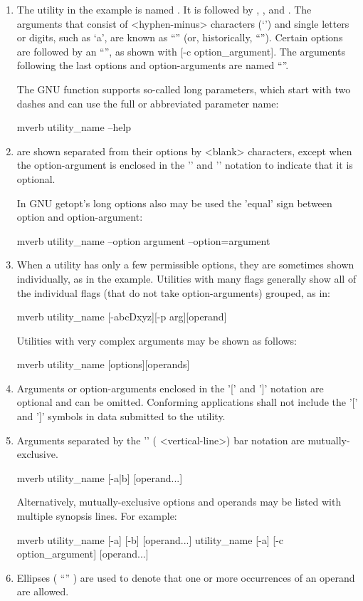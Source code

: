 \noindent
\begin{enumerate}
\item The utility in the example is named .
It is followed by , , and .
The arguments that consist of <hyphen-minus> characters (`\struct{-}') and
single letters or digits, such as `a', are known as ``''
(or, historically, ``''). Certain options are followed by
an ``'', as shown with [-c option\_argument].
The arguments following the last options and option-arguments are
named ``''.

The GNU  function supports so-called long parameters, which start
with two dashes and can use the full or abbreviated parameter name:
\begin{code}{mverb}
utility_name --help
\end{code}
\item {} are shown separated from their options by
<blank> characters, except when the option-argument is enclosed in the
'\struct{[}' and '\struct{]}' notation to indicate that it is optional.

In GNU getopt's long options also may be used the 'equal' sign between
option and option-argument:
\begin{code}{mverb}
utility_name --option argument --option=argument
\end{code}
\item When a utility has only a few permissible options, they are
sometimes shown individually, as in the example. Utilities with many
flags generally show all of the individual flags (that do not take
option-arguments) grouped, as in:
\begin{code}{mverb}
utility_name [-abcDxyz][-p arg][operand]
\end{code}
Utilities with very complex arguments may be shown as follows:
\begin{code}{mverb}
utility_name [options][operands]
\end{code}
\item Arguments or option-arguments enclosed in the '[' and ']'
notation are optional and can be omitted. Conforming applications shall
not include the '[' and ']' symbols in data submitted to the utility.
\item Arguments separated by the '\struct{|}' ( <vertical-line>) bar notation
are mutually-exclusive.
\begin{code}{mverb}
utility_name [-a|b] [operand...]
\end{code}
Alternatively, mutually-exclusive options and operands may be listed with
multiple synopsis lines. For example:
\begin{code}{mverb}
utility_name [-a] [-b] [operand...]
utility_name [-a] [-c option_argument] [operand...]
\end{code}
\item Ellipses ( ``'' ) are used to denote that one or more
occurrences of an operand are allowed.
\end{enumerate}
